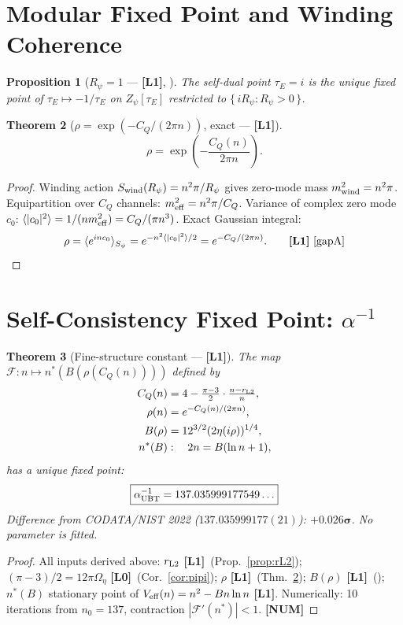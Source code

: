 \documentclass[12pt,a4paper]{article}
\newtheorem{theorem}{Theorem}[section]
\newtheorem{proposition}[theorem]{Proposition}
\theoremstyle{definition}\newtheorem{definition}[theorem]{Definition}
\theoremstyle{remark}\newtheorem{remark}[theorem]{Remark}
\newcommand{\Lz}{\textbf{[L0]}}
\newcommand{\Lo}{\textbf{[L1]}}
\begin{document}
\section{Modular Fixed Point and Winding Coherence}
\label{sec:rho}

\begin{proposition}[$R_\psi=1$ --- \Lo, \cite{modular}]
The self-dual point $\tau_E=i$ is the unique fixed point of
$\tau_E\mapsto-1/\tau_E$ on $Z_\psi[\tau_E]$
restricted to $\{\,iR_\psi:R_\psi>0\,\}$.
\end{proposition}

\begin{theorem}[$\rho=\exp(-C_Q/(2\pi n))$, exact --- \Lo]
\label{thm:rho}
\[
  \rho = \exp\!\left(-\frac{C_Q(n)}{2\pi n}\right).
\]
\end{theorem}
\begin{proof}
Winding action $S_{\rm wind}(R_\psi)=n^2\pi/R_\psi$ \cite{gapA}
gives zero-mode mass $m^2_{\rm wind}=n^2\pi$.
Equipartition over $C_Q$ channels: $m^2_{\rm eff}=n^2\pi/C_Q$.
Variance of complex zero mode $c_0$:
$\langle|c_0|^2\rangle=1/(nm^2_{\rm eff})=C_Q/(\pi n^3)$.
Exact Gaussian integral:
\[
  \rho = \langle e^{inc_0}\rangle_{S_\psi}
       = e^{-n^2\langle|c_0|^2\rangle/2}
       = e^{-C_Q/(2\pi n)}. \qquad\Lo\ \cite{gapA}
\]
\end{proof}

\section{Self-Consistency Fixed Point: $\alpha^{-1}$}
\label{sec:alpha}

\begin{theorem}[Fine-structure constant --- \Lo]
\label{thm:alpha}
The map $\mathcal{F}:n\mapsto n^*(B(\rho(C_Q(n))))$ defined by
\begin{align}
  C_Q(n)&=4-\tfrac{\pi-3}{2}\cdot\tfrac{n-r_{\rm L2}}{n},
  \label{eq:CQ}\\
  \rho(n)&=e^{-C_Q(n)/(2\pi n)},
  \label{eq:rho}\\
  B(\rho)&=12^{3/2}(2\eta(i\rho))^{1/4},
  \label{eq:B}\\
  n^*(B)&:\quad 2n=B(\ln n+1),
  \label{eq:nstar}
\end{align}
has a unique fixed point:
\[
  \boxed{\alpha^{-1}_{\rm UBT} = 137.035999177549\ldots}
\]
Difference from CODATA/NIST 2022
($137.035999177(21)$): $\mathbf{+0.026\sigma}$.
No parameter is fitted.
\end{theorem}
\begin{proof}
All inputs derived above: $r_{\rm L2}$ \Lo\ (Prop.~\ref{prop:rL2});
$(\pi-3)/2=12\pi\Omega_\eta$ \Lz\ (Cor.~\ref{cor:pipi});
$\rho$ \Lo\ (Thm.~\ref{thm:rho}); $B(\rho)$ \Lo\ (\cite{infoss});
$n^*(B)$ stationary point of $V_{\rm eff}(n)=n^2-Bn\ln n$ \Lo.
Numerically: 10 iterations from $n_0=137$, contraction
$|\mathcal{F}'(n^*)|<1$. \textbf{[NUM]}
\end{proof}
\end{document}
